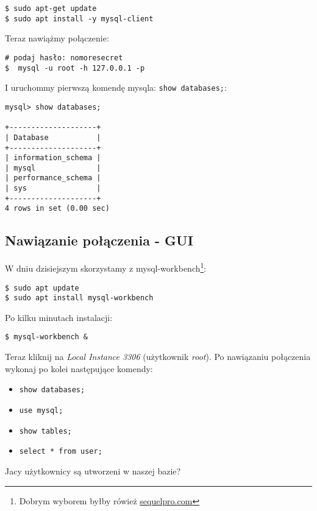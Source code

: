 \documentclass[12pt, letterpaper]{article}
\begin{document}
\begin{verbatim}
$ sudo apt-get update
$ sudo apt install -y mysql-client
\end{verbatim}

Teraz nawiążmy połączenie:

\begin{verbatim}
# podaj hasło: nomoresecret
$  mysql -u root -h 127.0.0.1 -p
\end{verbatim}

I uruchommy pierwszą komendę mysqla: \texttt{show databases;}:

\begin{verbatim}
mysql> show databases;

+--------------------+
| Database           |
+--------------------+
| information_schema |
| mysql              |
| performance_schema |
| sys                |
+--------------------+
4 rows in set (0.00 sec)
\end{verbatim}

\subsection{Nawiązanie połączenia - {\small GUI}}
W dniu dzisiejszym skorzystamy z mysql-workbench\footnote{Dobrym wyborem byłby rówież \href{https://sequelpro.com/download}{sequelpro.com}}:

\begin{verbatim}
$ sudo apt update
$ sudo apt install mysql-workbench
\end{verbatim}

Po kilku minutach instalacji:

\begin{verbatim}
$ mysql-workbench &
\end{verbatim}

Teraz kliknij na \emph{Local Instance 3306} (użytkownik \emph{root}). Po nawiązaniu połączenia wykonaj po kolei następujące komendy:


\begin{itemize}
\item \texttt{show databases;}
\item \texttt{use mysql;}
\item \texttt{show tables;}
\item \texttt{select * from user;}
\end{itemize}

Jacy użytkownicy są utworzeni w naszej bazie?
\bigskip
\bigskip
\bigskip
\end{document}
